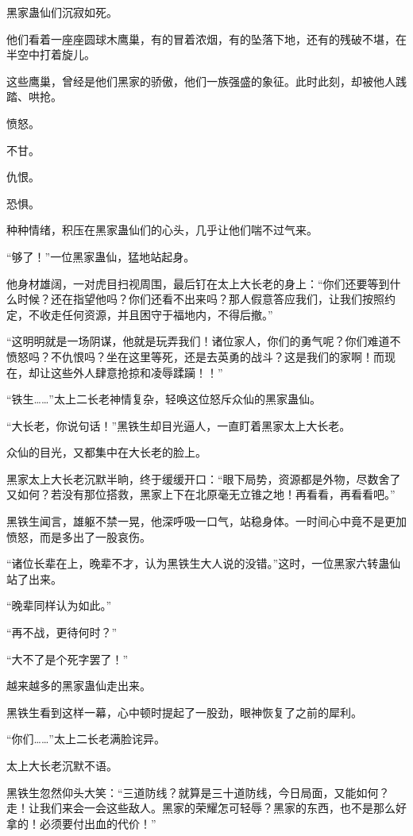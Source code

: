 \begin{this_body}
黑家蛊仙们沉寂如死。

他们看着一座座圆球木鹰巢，有的冒着浓烟，有的坠落下地，还有的残破不堪，在半空中打着旋儿。

这些鹰巢，曾经是他们黑家的骄傲，他们一族强盛的象征。此时此刻，却被他人践踏、哄抢。

愤怒。

不甘。

仇恨。

恐惧。

种种情绪，积压在黑家蛊仙们的心头，几乎让他们喘不过气来。

“够了！”一位黑家蛊仙，猛地站起身。

他身材雄阔，一对虎目扫视周围，最后钉在太上大长老的身上：“你们还要等到什么时候？还在指望他吗？你们还看不出来吗？那人假意答应我们，让我们按照约定，不收走任何资源，并且困守于福地内，不得后撤。”

“这明明就是一场阴谋，他就是玩弄我们！诸位家人，你们的勇气呢？你们难道不愤怒吗？不仇恨吗？坐在这里等死，还是去英勇的战斗？这是我们的家啊！而现在，却让这些外人肆意抢掠和凌辱蹂躏！！”

“铁生……”太上二长老神情复杂，轻唤这位怒斥众仙的黑家蛊仙。

“大长老，你说句话！”黑铁生却目光逼人，一直盯着黑家太上大长老。

众仙的目光，又都集中在大长老的脸上。

黑家太上大长老沉默半晌，终于缓缓开口：“眼下局势，资源都是外物，尽数舍了又如何？若没有那位搭救，黑家上下在北原毫无立锥之地！再看看，再看看吧。”

黑铁生闻言，雄躯不禁一晃，他深呼吸一口气，站稳身体。一时间心中竟不是更加愤怒，而是多出了一股哀伤。

“诸位长辈在上，晚辈不才，认为黑铁生大人说的没错。”这时，一位黑家六转蛊仙站了出来。

“晚辈同样认为如此。”

“再不战，更待何时？”

“大不了是个死字罢了！”

越来越多的黑家蛊仙走出来。

黑铁生看到这样一幕，心中顿时提起了一股劲，眼神恢复了之前的犀利。

“你们……”太上二长老满脸诧异。

太上大长老沉默不语。

黑铁生忽然仰头大笑：“三道防线？就算是三十道防线，今日局面，又能如何？走！让我们来会一会这些敌人。黑家的荣耀怎可轻辱？黑家的东西，也不是那么好拿的！必须要付出血的代价！”


\end{this_body}
